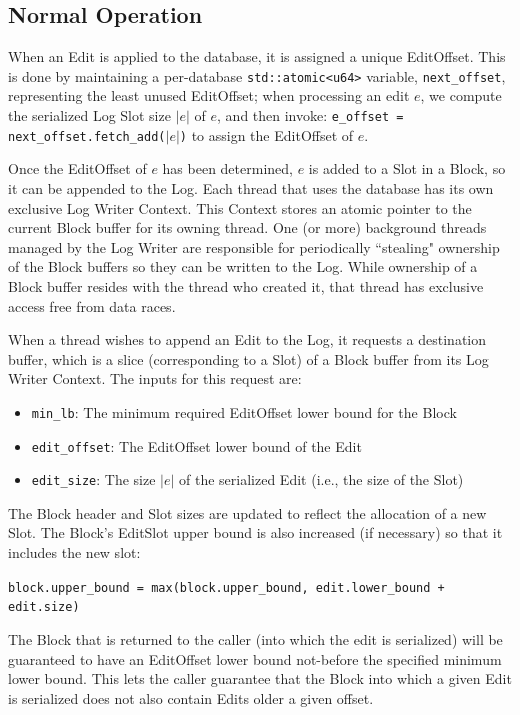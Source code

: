 \documentclass[11pt]{article}
\begin{document}
\subsection{Normal Operation}

When an Edit is applied to the database, it is assigned a unique
EditOffset.  This is done by maintaining a per-database
\texttt{std::atomic<u64>} variable, \texttt{next\_offset},
representing the least unused EditOffset; when processing an edit $e$,
we compute the serialized Log Slot size $|e|$ of $e$, and then invoke:
\texttt{e\_offset = next\_offset.fetch\_add($|e|$)} to assign the
EditOffset of $e$.

Once the EditOffset of $e$ has been determined, $e$ is added to a Slot
in a Block, so it can be appended to the Log.  Each thread that uses
the database has its own exclusive Log Writer Context.  This Context
stores an atomic pointer to the current Block buffer for its owning
thread.  One (or more) background threads managed by the Log Writer
are responsible for periodically ``stealing" ownership of the Block
buffers so they can be written to the Log.  While ownership of a Block
buffer resides with the thread who created it, that thread has
exclusive access free from data races.

When a thread wishes to append an Edit to the Log, it requests a
destination buffer, which is a slice (corresponding to a Slot) of a
Block buffer from its Log Writer Context.  The inputs for this request
are:

\begin{itemize}
	\item \texttt{min\_lb}: The minimum required EditOffset lower
          bound for the Block
	\item \texttt{edit\_offset}: The EditOffset lower bound of the
          Edit
	\item \texttt{edit\_size}: The size $|e|$ of the serialized
          Edit (i.e., the size of the Slot)
\end{itemize}

The Block header and Slot sizes are updated to reflect the allocation
of a new Slot.  The Block's EditSlot upper bound is also increased (if
necessary) so that it includes the new slot:

\vspace{11pt} \small{\texttt{block.upper\_bound =
    max(block.upper\_bound, edit.lower\_bound + edit.size)}}
\vspace{11pt}

The Block that is returned to the caller (into which the edit is
serialized) will be guaranteed to have an EditOffset lower bound
not-before the specified minimum lower bound.  This lets the caller
guarantee that the Block into which a given Edit is serialized does
not also contain Edits older a given offset.
\end{document}
